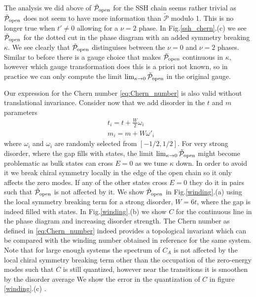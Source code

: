 \documentclass[twocolumn,amsmath,longbibliography,amssymb,superscriptaddress]{revtex4-1}
\begin{document}
The analysis we did above of $\tilde{\mathcal{P}}_{\rm open}$ for the SSH chain seems rather trivial as $\tilde{\mathcal{P}}_{\rm open}$ does not seem to have more information than $\tilde{\mathcal{P}}$ modulo 1. This is no longer true when $t' \neq 0$ allowing for a $\nu = 2$ phase. In Fig.\ref{ssh_chern}.(c) we see $\tilde{\mathcal{P}}_{\rm open}$ for the dotted cut in the phase diagram with an added symmetry breaking $\kappa$. We see clearly that $\tilde{\mathcal{P}}_{\rm open}$ distinguises between the $\nu=0$ and $\nu = 2$ phases. Similar to before there is a gauge choice that makes $\tilde{\mathcal{P}}_{\rm open}$ continuous in $\kappa$, however which gauge transformation does this is a priori not known, so in practice we can only compute the limit $\lim_{\kappa \rightarrow 0} \tilde{\mathcal{P}}_{\rm open}$ in the original gauge.

Our expression for the Chern number \eqref{eq:Chern_number} is also valid without translational invariance. Consider now that we add disorder in the $t$ and $m$ parameters
\begin{align}
&t_i = t + \frac{W}{2} \omega_i \\
&m_i = m + W \omega'_i
\end{align}
where $\omega_i$ and $\omega_i$ are randomly selected from $[-1/2,1/2]$. For very strong disorder, where the gap fills with states, the limit $\lim_{\kappa \rightarrow 0} \tilde{\mathcal{P}}_{\rm open}$ might become problematic as bulk states can cross $E=0$ as we tune $\kappa$ down. In order to avoid it we break chiral symmetry locally in the edge of the open chain so it only affects the zero modes. If any of the other states cross $E=0$ they do it in pairs such that $\tilde{\mathcal{P}}_{\rm open}$ is not affected by it. We show $\tilde{\mathcal{P}}_{\rm open}$ in Fig.\ref{winding}.(a) using the local symmetry breaking term for a strong disorder, $W=6t$, where the gap is indeed filled with states. In Fig.\ref{winding}.(b) we show $C$ for the continuous line in the phase diagram and increasing disorder strength. The Chern number as defined in \eqref{eq:Chern_number} indeed provides a topological invariant which can be compared with the winding number obtained in reference \cite{Song2014} for the same system. Note that for large enough systems the spectrum of $C_A$ is not affected by the local chiral symmetry breaking term other than the occupation of the zero-energy modes such that $C$ is still quantized, however near the transitions it is smoothen by the disorder average We show the error in the quantization of $C$ in figure \ref{winding}.(c) . 
\end{document}
